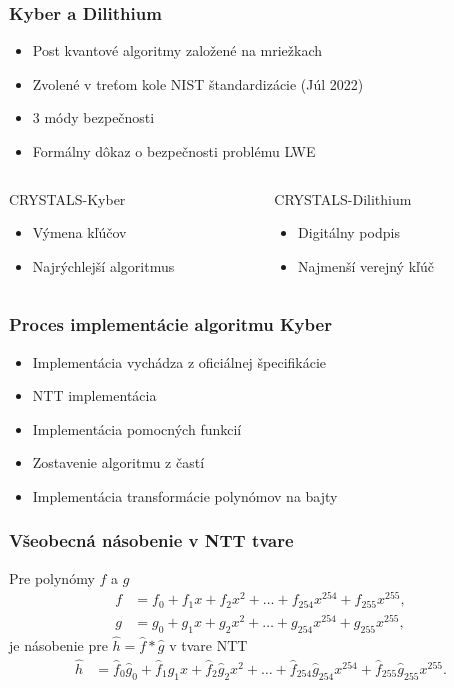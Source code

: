 \documentclass[%
  14pt,       				%
	t,                  %
	aspectratio=1610,   %
	unicode,						%
]{beamer}				    	%
\begin{document}
\begin{frame}[c]

	\frametitle{Kyber a Dilithium}
	\large{
		\begin{itemize}
			\item Post kvantové algoritmy založené na mriežkach
			\item Zvolené v treťom kole NIST štandardizácie (Júl 2022)
			\item 3 módy bezpečnosti
			\item Formálny dôkaz o bezpečnosti problému LWE
		\end{itemize}
		\vspace{3ex}
		\begin{columns}[T]
			\begin{column}{0.5\textwidth}
				CRYSTALS-Kyber
				\begin{itemize}
					\item Výmena kľúčov
					\item Najrýchlejší algoritmus
				\end{itemize}
			\end{column}
			\begin{column}{0.5\textwidth}
				CRYSTALS-Dilithium
				\begin{itemize}
					\item Digitálny podpis
					\item Najmenší verejný kľúč
				\end{itemize}
			\end{column}
		\end{columns}
	}
\end{frame}

\begin{frame}[c]
	\frametitle{Proces implementácie algoritmu Kyber}
	\large{
		\begin{itemize}
			\item Implementácia vychádza z oficiálnej špecifikácie
			\item NTT implementácia
			\item Implementácia pomocných funkcií
			\item Zostavenie algoritmu z častí
			\item Implementácia transformácie polynómov na bajty
		\end{itemize}
	}
\end{frame}

\begin{frame}[c]
	\frametitle{Všeobecná násobenie v NTT tvare}
	\large{
		Pre polynómy $f$ a $g$
		\begin{align*}
			f & = f_0 + f_1x + f_2x^2 + \dots + f_{254}x^{254} + f_{255}x^{255}, \\
			g & = g_0 + g_1x + g_2x^2 + \dots + g_{254}x^{254} + g_{255}x^{255},
		\end{align*}
		je násobenie pre $\hat{h}=\hat{f}*\hat{g}$ v tvare NTT
		\begin{align*}
			\hat{h} & = \hat{f}_0\hat{g}_0 + \hat{f}_1\hat{g}_1x + \hat{f}_2\hat{g}_2x^2 + \dots + \hat{f}_{254}\hat{g}_{254}x^{254} + \hat{f}_{255}\hat{g}_{255}x^{255}.
		\end{align*}
	}
\end{frame}
\end{document}
